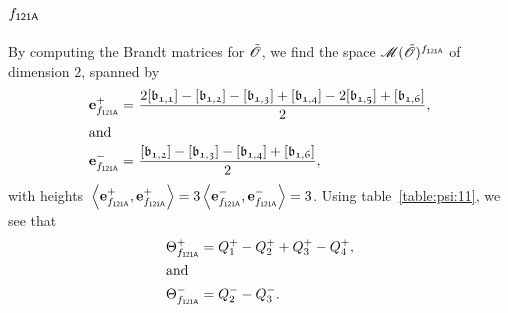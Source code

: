 \subsection{$f_\mathsf{{121A}}$}
By computing the Brandt matrices for ${\tilde{{\mathscr{O}}}}$,
we find the space $\operatorname{{\mathscr M}}({\tilde{{\mathscr{O}}}})^{f_\mathsf{{121A}}}
$
of dimension $2$, spanned by
\begin{align*}
  \e{\mf{121A}}^+ = &\ \frac{2\cls{b_{1,1}}-\cls{b_{1,2}}-\cls{b_{1,3}}+\cls{b_{1,4}}-2\cls{b_{1,5}}+\cls{b_{1,6}}}{2},\\
\intertext{and}
  \e{\mf{121A}}^- = &\ \frac{\cls{b_{1,2}}-\cls{b_{1,3}}-\cls{b_{1,4}}+\cls{b_{1,6}}}{2},\\
\end{align*}
with heights $\,\<\e{\mf{121A}}^+,\e{\mf{121A}}^+>=3\,\<\e{\mf{121A}}^-,\e{\mf{121A}}^->=3$.
Using table~\ref{table:psi:11},
we see that
\begin{align*}
  {\Theta}^+_{f_\mathsf{{121A}}} & =  Q_{1}^{+} - Q_{2}^{+} + Q_{3}^{+} - Q_{4}^{+}, \\
\intertext{and}
  {\Theta}^-_{f_\mathsf{{121A}}} & =  Q_{2}^{-} - Q_{3}^{-}. \\
\end{align*}
